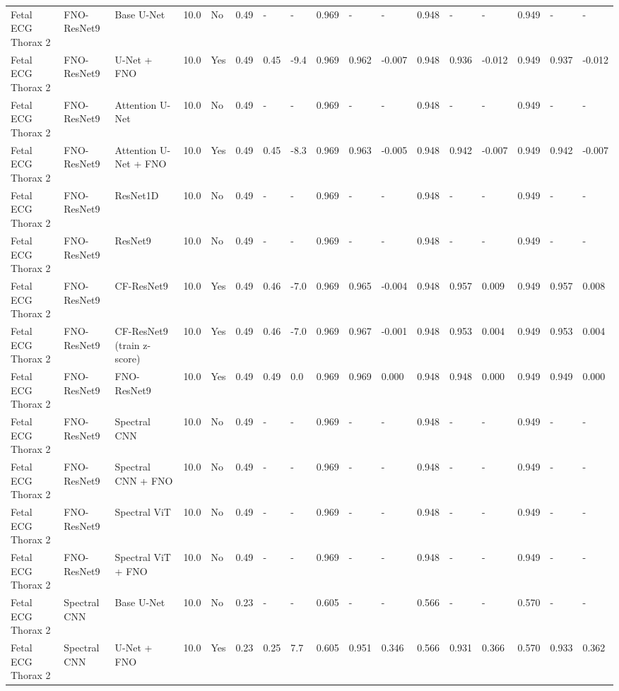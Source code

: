 \begin{longtable}{lllllllllllllllll}
Fetal ECG Thorax 2 & FNO-ResNet9 & Base U-Net & 10.0 & No & 0.49 & - & - & 0.969 & - & - & 0.948 & - & - & 0.949 & - & - \\
Fetal ECG Thorax 2 & FNO-ResNet9 & U-Net + FNO & 10.0 & Yes & 0.49 & 0.45 & -9.4 & 0.969 & 0.962 & -0.007 & 0.948 & 0.936 & -0.012 & 0.949 & 0.937 & -0.012 \\
Fetal ECG Thorax 2 & FNO-ResNet9 & Attention U-Net & 10.0 & No & 0.49 & - & - & 0.969 & - & - & 0.948 & - & - & 0.949 & - & - \\
Fetal ECG Thorax 2 & FNO-ResNet9 & Attention U-Net + FNO & 10.0 & Yes & 0.49 & 0.45 & -8.3 & 0.969 & 0.963 & -0.005 & 0.948 & 0.942 & -0.007 & 0.949 & 0.942 & -0.007 \\
Fetal ECG Thorax 2 & FNO-ResNet9 & ResNet1D & 10.0 & No & 0.49 & - & - & 0.969 & - & - & 0.948 & - & - & 0.949 & - & - \\
Fetal ECG Thorax 2 & FNO-ResNet9 & ResNet9 & 10.0 & No & 0.49 & - & - & 0.969 & - & - & 0.948 & - & - & 0.949 & - & - \\
Fetal ECG Thorax 2 & FNO-ResNet9 & CF-ResNet9 & 10.0 & Yes & 0.49 & 0.46 & -7.0 & 0.969 & 0.965 & -0.004 & 0.948 & 0.957 & 0.009 & 0.949 & 0.957 & 0.008 \\
Fetal ECG Thorax 2 & FNO-ResNet9 & CF-ResNet9 (train z-score) & 10.0 & Yes & 0.49 & 0.46 & -7.0 & 0.969 & 0.967 & -0.001 & 0.948 & 0.953 & 0.004 & 0.949 & 0.953 & 0.004 \\
Fetal ECG Thorax 2 & FNO-ResNet9 & FNO-ResNet9 & 10.0 & Yes & 0.49 & 0.49 & 0.0 & 0.969 & 0.969 & 0.000 & 0.948 & 0.948 & 0.000 & 0.949 & 0.949 & 0.000 \\
Fetal ECG Thorax 2 & FNO-ResNet9 & Spectral CNN & 10.0 & No & 0.49 & - & - & 0.969 & - & - & 0.948 & - & - & 0.949 & - & - \\
Fetal ECG Thorax 2 & FNO-ResNet9 & Spectral CNN + FNO & 10.0 & No & 0.49 & - & - & 0.969 & - & - & 0.948 & - & - & 0.949 & - & - \\
Fetal ECG Thorax 2 & FNO-ResNet9 & Spectral ViT & 10.0 & No & 0.49 & - & - & 0.969 & - & - & 0.948 & - & - & 0.949 & - & - \\
Fetal ECG Thorax 2 & FNO-ResNet9 & Spectral ViT + FNO & 10.0 & No & 0.49 & - & - & 0.969 & - & - & 0.948 & - & - & 0.949 & - & - \\
Fetal ECG Thorax 2 & Spectral CNN & Base U-Net & 10.0 & No & 0.23 & - & - & 0.605 & - & - & 0.566 & - & - & 0.570 & - & - \\
Fetal ECG Thorax 2 & Spectral CNN & U-Net + FNO & 10.0 & Yes & 0.23 & 0.25 & 7.7 & 0.605 & 0.951 & 0.346 & 0.566 & 0.931 & 0.366 & 0.570 & 0.933 & 0.362 \\

\end{longtable}
